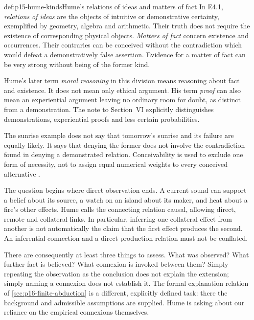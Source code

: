 \begin{hbdefinition}{def:p15-hume-kinds}{Hume's relations of ideas and matters of fact}
In E4.1, \emph{relations of ideas} are the objects of intuitive or
demonstrative certainty, exemplified by geometry, algebra and arithmetic.
Their truth does not require the existence of corresponding physical
objects. \emph{Matters of fact} concern existence and occurrences.
Their contraries can be conceived without the contradiction which would
defeat a demonstratively false assertion. Evidence for a matter of fact
can be very strong without being of the former kind.

Hume's later term \emph{moral reasoning} in this division means reasoning
about fact and existence. It does not mean only ethical argument.
His term \emph{proof} can also mean an experiential argument leaving no
ordinary room for doubt, as distinct from a demonstration. The note to
Section~VI explicitly distinguishes demonstrations, experiential proofs
and less certain probabilities.
\end{hbdefinition}

The sunrise example does not say that tomorrow's sunrise and its failure
are equally likely. It says that denying the former does not involve
the contradiction found in denying a demonstrated relation. Conceivability
is used to exclude one form of necessity, not to assign equal numerical
weights to every conceived alternative
\parencite[E~4.1--4.2, 6.0n10]{Hume1777EnquiryHTO}.

The question begins where direct observation ends. A current sound can
support a belief about its source, a watch on an island about its maker,
and heat about a fire's other effects. Hume calls the connecting relation
causal, allowing direct, remote and collateral links. In particular,
inferring one collateral effect from another is not automatically the
claim that the first effect produces the second. An inferential connection
and a direct production relation must not be conflated.

There are consequently at least three things to assess. What was observed?
What further fact is believed? What connexion is invoked between them?
Simply repeating the observation as the conclusion does not explain
the extension; simply naming a connexion does not establish it.
The formal explanation relation of
\cref{sec:p16-finite-abduction} is a different, explicitly defined task:
there the background and admissible assumptions are supplied. Hume is
asking about our reliance on the empirical connexions themselves.

